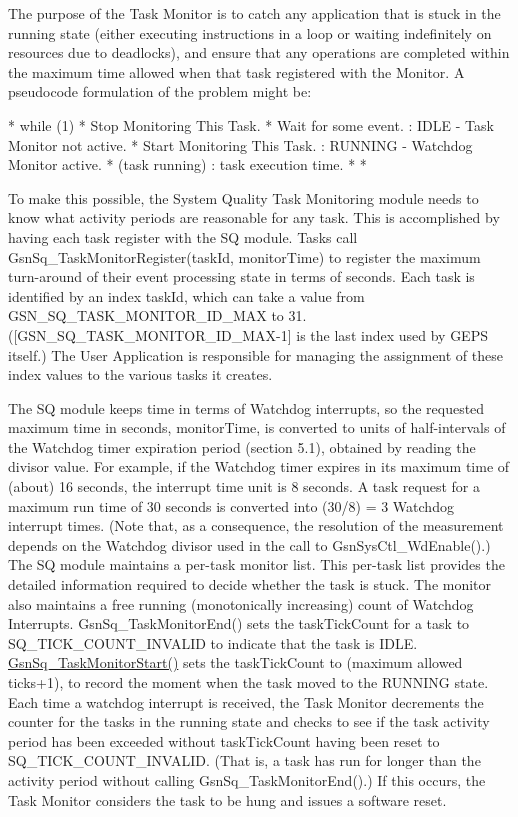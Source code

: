 The purpose of the Task Monitor is to catch any application that is stuck in the running state (either executing instructions in a loop or waiting indefinitely on resources due to deadlocks), and ensure that any operations are completed within the maximum time allowed when that task registered with the Monitor. A pseudocode formulation of the problem might be: \begin{DoxyVerb}
 *   while (1) {
 *             Stop Monitoring This Task.
 *             Wait for some event.	  	: IDLE - Task Monitor not active.
 *             Start Monitoring This Task.	: RUNNING - Watchdog Monitor active.
 *             (task running)			: task execution time.
 *             }
 *  \end{DoxyVerb}


To make this possible, the System Quality Task Monitoring module needs to know what activity periods are reasonable for any task. This is accomplished by having each task register with the SQ module. Tasks call GsnSq\_\-TaskMonitorRegister(taskId, monitorTime) to register the maximum turn-\/around of their event processing state in terms of seconds. Each task is identified by an index taskId, which can take a value from GSN\_\-SQ\_\-TASK\_\-MONITOR\_\-ID\_\-MAX to 31. (\mbox{[}GSN\_\-SQ\_\-TASK\_\-MONITOR\_\-ID\_\-MAX-\/1\mbox{]} is the last index used by GEPS itself.) The User Application is responsible for managing the assignment of these index values to the various tasks it creates. \par
 \par
 The SQ module keeps time in terms of Watchdog interrupts, so the requested maximum time in seconds, monitorTime, is converted to units of half-\/intervals of the Watchdog timer expiration period (section 5.1), obtained by reading the divisor value. For example, if the Watchdog timer expires in its maximum time of (about) 16 seconds, the interrupt time unit is 8 seconds. A task request for a maximum run time of 30 seconds is converted into (30/8) = 3 Watchdog interrupt times. (Note that, as a consequence, the resolution of the measurement depends on the Watchdog divisor used in the call to GsnSysCtl\_\-WdEnable().) The SQ module maintains a per-\/task monitor list. This per-\/task list provides the detailed information required to decide whether the task is stuck. The monitor also maintains a free running (monotonically increasing) count of Watchdog Interrupts. GsnSq\_\-TaskMonitorEnd() sets the taskTickCount for a task to SQ\_\-TICK\_\-COUNT\_\-INVALID to indicate that the task is IDLE. \hyperlink{a00675_ga96da464fdeb49f53790f74732ef808a9}{GsnSq\_\-TaskMonitorStart()} sets the taskTickCount to (maximum allowed ticks+1), to record the moment when the task moved to the RUNNING state. Each time a watchdog interrupt is received, the Task Monitor decrements the counter for the tasks in the running state and checks to see if the task activity period has been exceeded without taskTickCount having been reset to SQ\_\-TICK\_\-COUNT\_\-INVALID. (That is, a task has run for longer than the activity period without calling GsnSq\_\-TaskMonitorEnd().) If this occurs, the Task Monitor considers the task to be hung and issues a software reset. 

